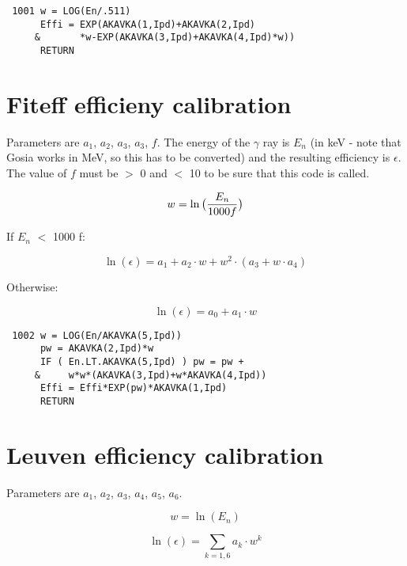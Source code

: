 \begin{verbatim}
 1001 w = LOG(En/.511)
      Effi = EXP(AKAVKA(1,Ipd)+AKAVKA(2,Ipd)
     &       *w-EXP(AKAVKA(3,Ipd)+AKAVKA(4,Ipd)*w))
      RETURN
\end{verbatim}

\section{Fiteff efficieny calibration}

Parameters are $a_1$, $a_2$, $a_3$, $a_3$, $f$. The energy of the $\gamma$
ray is $E_n$ (in keV - note that Gosia works in MeV, so this has to be
converted) and the resulting efficiency is $\epsilon$. The value of $f$ must
be $>$ 0 and $<$ 10 to be sure that this code is called.

\begin{equation}
w = \ln\big({E_n \over 1000 f}\big)
\end{equation}

If $E_n$ $<$ 1000 f:

\begin{equation}
\ln(\epsilon) = a_1 + a_2 \cdot w + w^2 \cdot (a_3 + w \cdot a_4)
\end{equation}

Otherwise:

\begin{equation}
\ln(\epsilon) = a_0 + a_1 \cdot w
\end{equation}

\begin{verbatim}
 1002 w = LOG(En/AKAVKA(5,Ipd))
      pw = AKAVKA(2,Ipd)*w
      IF ( En.LT.AKAVKA(5,Ipd) ) pw = pw +
     &     w*w*(AKAVKA(3,Ipd)+w*AKAVKA(4,Ipd))
      Effi = Effi*EXP(pw)*AKAVKA(1,Ipd)
      RETURN
\end{verbatim}

\section{Leuven efficiency calibration}

Parameters are $a_1$, $a_2$, $a_3$, $a_4$, $a_5$, $a_6$.

\begin{equation}
w = \ln(E_n)
\end{equation}

\begin{equation}
\ln(\epsilon) = \sum_{k=1,6} a_k \cdot w^k
\end{equation}


